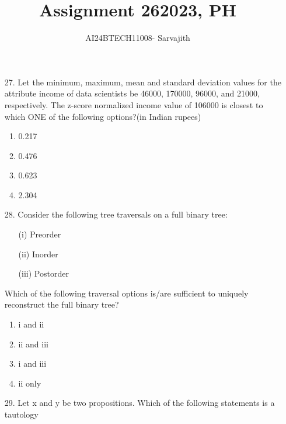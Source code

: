 \documentclass[journal]{IEEEtran}
\begin{document}

\vspace{3cm}


\author{AI24BTECH11008- Sarvajith
}
\title{Assignment 26}
{\let\newpage\relax\maketitle}
\title{2023, PH}
\renewcommand{\thefigure}{\theenumi}
\renewcommand{\thetable}{\theenumi}
\setlength{\intextsep}{10pt} %
\renewcommand{\thetable}{\theenumi}
\begin{enumerate}
    \item[27.] Let the minimum, maximum, mean and standard deviation values for the attribute
    income of data scientists be 46000, 170000, 96000, and 21000, respectively.
    The z-score normalized income value of 106000 is closest to which ONE of the
    following options?(in Indian rupees)
    \begin{enumerate}[label = (\Alph*)]
        \item 0.217
        \item 0.476
        \item 0.623
        \item 2.304
    \end{enumerate}
    \item[28.] Consider the following tree traversals on a full binary tree:
    \begin{itemize}
        \item[(i)] Preorder
        \item[(ii)] Inorder
        \item[(iii)] Postorder  
    \end{itemize}
    Which of the following traversal options is/are sufficient to uniquely reconstruct the full binary tree?
    \begin{enumerate}[label = (\Alph*)]
        \item i and ii
        \item ii and iii 
        \item i and iii 
        \item ii only 
    \end{enumerate} 
    \item[29.] Let x and y be two propositions. Which of the following statements is a tautology

\end{enumerate}
\end{document}
